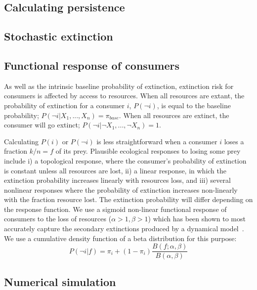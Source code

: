 \documentclass[12pt]{article}
\begin{document}
\begin{spacing}{2.0}
\section{Calculating persistence}        

    \subsection{Stochastic extinction}



    \subsection{Functional response of consumers}

        As well as the intrinsic baseline probability of extinction, extinction risk for consumers is affected by access to resources. 
		When all resources are extant, the probability of extinction for a consumer $i$, $P(\lnot i)$, is equal to the baseline probability; $P(\lnot i|X_{1},...,X_{n}) = \pi_{base}$. 
		When all resources are extinct, the consumer will go extinct; $P(\lnot i|\lnot X_{1},...,\lnot X_{n})=1$. 

		Calculating $P(i)$ or $P(\lnot i)$ is less straightforward when a consumer $i$ loses a fraction $k/n = f$ of its prey. 
		Plausible ecological responses to losing some prey include i) a topological response, where the consumer's probability of extinction is constant unless all resources are lost, ii) a linear response, in which the extinction probability increases linearly with resources loss, and iii) several nonlinear responses where the probability of extinction increases non-linearly with the fraction resource lost. 
		The extinction probability will differ depending on the response function. 
		We use a sigmoid non-linear functional response of consumers to the loss of resources ($\alpha >1, \beta >1$) which has been shown to most accurately capture the secondary extinctions produced by a dynamical model~\citep{Eklof2013}. 
		We use a cumulative density function of a beta distribution for this purpose:
		\begin{equation}
		\label{betafunc}
		P(\lnot i|f) = \pi_{i} + (1 - \pi_{i}) \frac{B(f;\alpha,\beta)}{B(\alpha,\beta)}
		\end{equation}


    \subsection{Numerical simulation}




\end{spacing}
\end{document}
